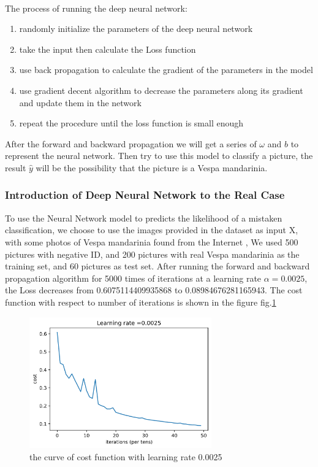 \documentclass{mcmthesis}
\begin{document}
\paragraph{ }
The process of running the deep neural network: 
\begin{enumerate}
    \item randomly initialize the parameters of the deep neural network
    \item take the input then calculate the Loss function
    \item use back propagation to calculate the gradient of the parameters in the model
    \item use gradient decent algorithm to decrease the parameters along its gradient and update them in the network
    \item repeat the procedure until the loss function is small enough
\end{enumerate}

After the forward and backward propagation we will get a series of $\omega$ and $b$ to represent the neural network. Then try to use this model to classify a picture, the result $\hat{y}$ will be the possibility that the picture is a Vespa mandarinia.
\subsubsection{Introduction of Deep Neural Network to the Real Case} 
To use the Neural Network model to  predicts the likelihood of a mistaken classification, we choose to use the images provided in the dataset as input X, with some photos of Vespa mandarinia found from the Internet \cite{AGH}, 
We used 500 pictures with negative ID, and 200 pictures with real Vespa mandarinia as the training set, and 60 pictures as test set. After running the 
forward and backward propagation algorithm for 5000 times of iterations at a learning rate $\alpha = 0.0025$, the Loss decreases from  0.6075114409935868 to 0.08984676281165943. The cost function with respect to number of iterations is shown in the figure fig.\ref{fig:COSTFUNCTION}

\begin{figure}[!htbp]
	\centering
 	\includegraphics[width = 0.7\textwidth]{costFunction.png} 
	\caption{the curve of cost function with learning rate 0.0025}
	\label{fig:COSTFUNCTION}
\end{figure}
\end{document}
